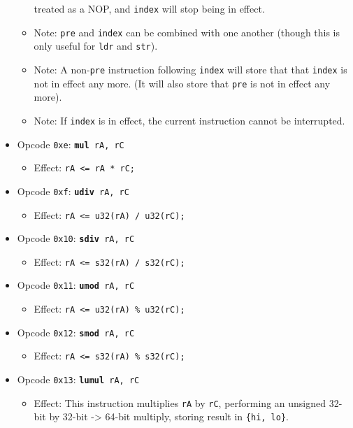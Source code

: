\documentclass{article}
\begin{document}
\begin{itemize}
\begin{itemize}
			treated as a NOP, and \texttt{index} will stop being in effect.
			\item Note:  \texttt{pre} and \texttt{index} can be combined
			with one another (though this is only useful for \texttt{ldr}
			and \texttt{str}).
			\item Note:  A non-\texttt{pre} instruction following
			\texttt{index} will store that that \texttt{index} is not in
			effect any more.  (It will also store that \texttt{pre} is not
			in effect any more).
			\item Note:  If \texttt{index} is in effect, the current
			instruction cannot be interrupted.
		\end{itemize}
		\item Opcode \texttt{0xe}:
			\texttt{\textbf{mul} rA, rC}
		\begin{itemize}
			\item Effect:  \texttt{rA <= rA * rC;}
		\end{itemize}
		\item Opcode \texttt{0xf}:
			\texttt{\textbf{udiv} rA, rC}
		\begin{itemize}
			\item Effect:  \texttt{rA <= u32(rA) / u32(rC);}
		\end{itemize}
		\item Opcode \texttt{0x10}:
			\texttt{\textbf{sdiv} rA, rC}
		\begin{itemize}
			\item Effect:  \texttt{rA <= s32(rA) / s32(rC);}
		\end{itemize}
		\item Opcode \texttt{0x11}:
			\texttt{\textbf{umod} rA, rC}
		\begin{itemize}
			\item Effect:  \texttt{rA <= u32(rA) \% u32(rC);}
		\end{itemize}
		\item Opcode \texttt{0x12}:
			\texttt{\textbf{smod} rA, rC}
		\begin{itemize}
			\item Effect:  \texttt{rA <= s32(rA) \% s32(rC);}
		\end{itemize}
		\item Opcode \texttt{0x13}:
			\texttt{\textbf{lumul} rA, rC}
		\begin{itemize}
			\item Effect:  This instruction multiplies \texttt{rA} by
			\texttt{rC}, performing an unsigned 32-bit by 32-bit -> 64-bit
			multiply, storing result in \texttt{\{hi, lo\}}.

\end{itemize}
\end{itemize}
\end{document}
